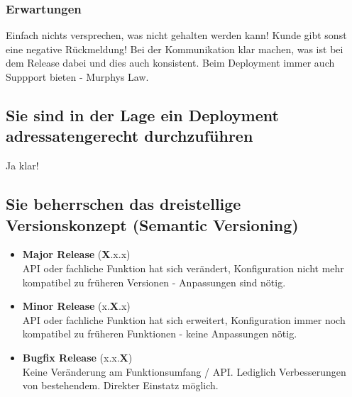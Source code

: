 \subsubsection{Erwartungen}
Einfach nichts versprechen, was nicht gehalten werden kann! Kunde gibt sonst eine negative Rückmeldung! Bei der Kommunikation klar machen, was ist bei dem Release dabei und dies auch konsistent. Beim Deployment immer auch Suppport bieten - Murphys Law.

\subsection{Sie sind in der Lage ein Deployment adressatengerecht durchzuführen}
Ja klar!

\subsection{Sie beherrschen das dreistellige Versionskonzept (Semantic Versioning)}
\begin{itemize}
  \item \textbf{Major Release} (\textbf{X}.x.x)\\
  API oder fachliche Funktion hat sich verändert, Konfiguration nicht mehr kompatibel zu früheren Versionen - Anpassungen sind nötig.
  \item \textbf{Minor Release} (x.\textbf{X}.x)\\
  API oder fachliche Funktion hat sich erweitert, Konfiguration immer noch kompatibel zu früheren Funktionen - keine Anpassungen nötig.
  \item \textbf{Bugfix Release} (x.x.\textbf{X})\\
  Keine Veränderung am Funktionsumfang / API. Lediglich Verbesserungen von bestehendem. Direkter Einstatz möglich.
  
\end{itemize}

